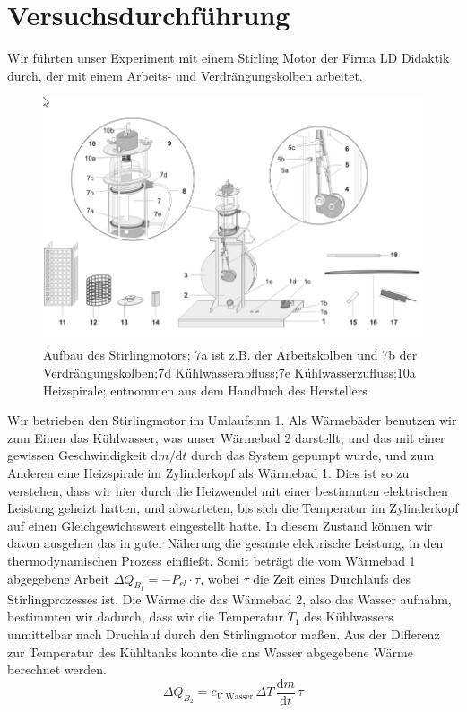 \documentclass[a4paper, 12pt,]{scrartcl}
\begin{document}
\section{Versuchsdurchführung}
Wir führten unser Experiment mit einem Stirling Motor der Firma LD Didaktik durch, der mit einem Arbeits- und Verdrängungskolben arbeitet.
\begin{figure}[H]\centering\includegraphics[scale=0.6]{Stirlingmotor}\caption{Aufbau des Stirlingmotors; 7a ist z.B. der Arbeitskolben und 7b der Verdrängungskolben;7d Kühlwasserabfluss;7e Kühlwasserzufluss;10a Heizspirale; entnommen aus dem Handbuch des Herstellers}\end{figure}

Wir betrieben den Stirlingmotor im Umlaufsinn 1. Als Wärmebäder benutzen wir zum Einen das Kühlwasser, was unser Wärmebad 2 darstellt, und das mit einer gewissen Geschwindigkeit $\text{d}m/\text{d}t$ durch das System gepumpt wurde, und zum Anderen eine Heizspirale im Zylinderkopf als Wärmebad 1. Dies ist so zu verstehen, dass wir hier durch die Heizwendel mit einer bestimmten elektrischen Leistung geheizt hatten, und abwarteten, bis sich die Temperatur im Zylinderkopf auf einen Gleichgewichtswert eingestellt hatte. In diesem Zustand können wir davon ausgehen das in guter Näherung die gesamte elektrische Leistung, in den thermodynamischen Prozess einfließt. Somit beträgt die vom Wärmebad 1 abgegebene Arbeit $\Delta{Q_{B_1}}=-P_{el}\cdot{\tau}$, wobei $\tau$ die Zeit eines Durchlaufs des Stirlingprozesses ist.
Die Wärme die das Wärmebad 2, also das Wasser aufnahm, bestimmten wir dadurch, dass wir die Temperatur $T_1$ des Kühlwassers unmittelbar nach Druchlauf durch den Stirlingmotor maßen. Aus der Differenz zur Temperatur des Kühltanks konnte die ans Wasser abgegebene Wärme berechnet werden.
\begin{equation*}\Delta{Q_{B_2}}=c_{V,\text{Wasser}}\,\Delta{T}\,\frac{\text{d}m}{\text{d}t}\,\tau\end{equation*}
\end{document}
